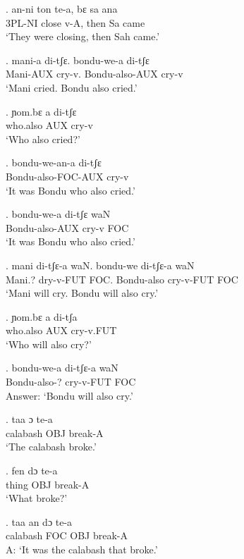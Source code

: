 \documentclass{assets/fieldnotes}
\begin{document}
\exg.
an-ni    ton     te-a,   bɛ     sa   ana  \\
3PL-NI   close   v-A,    then   Sa   came \\%
`They were closing, then Sah came.'

\exg.
mani-a     di-tʃɛ.   bondu-we-a       di-tʃɛ \\
Mani-AUX   cry-v.    Bondu-also-AUX   cry-v  \\%
`Mani cried. Bondu also cried.'

\exg.
ɲom.bɛ   a     di-tʃɛ \\
who.also     AUX   cry-v  \\%
`Who also cried?'

\exg.
bondu-we-an-a        di-tʃɛ \\
Bondu-also-FOC-AUX   cry-v  \\%
`It was Bondu who also cried.'

\exg.
bondu-we-a       di-tʃɛ   waN \\
Bondu-also-AUX   cry-v    FOC \\%
`It was Bondu who also cried.'

\exg.
mani     di-tʃɛ-a    waN.   bondu-we     di-tʃɛ-a    waN \\
Mani.?   dry-v-FUT   FOC.   Bondu-also   cry-v-FUT   FOC \\%
`Mani will cry. Bondu will also cry.'


\exg.
ɲom.bɛ     a     di-tʃa    \\
who.also   AUX   cry-v.FUT \\%
`Who will also cry?'

\exg.
bondu-we-a     di-tʃɛ-a    waN \\
Bondu-also-?   cry-v-FUT   FOC \\%
Answer: `Bondu will also cry.'

\exg.
taa        ɔ     te-a    \\
calabash   OBJ   break-A \\%
`The calabash broke.'

\exg.
fen     dɔ    te-a    \\
thing   OBJ   break-A \\%
`What broke?'

\exg.
taa        an    dɔ    te-a    \\
calabash   FOC   OBJ   break-A \\%
A: `It was the calabash that broke.'
\end{document}
